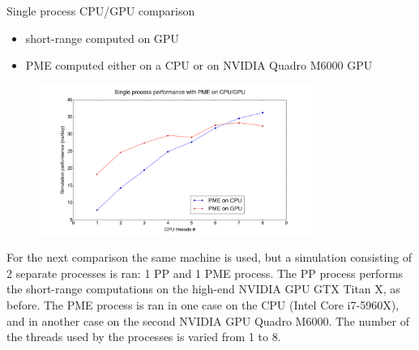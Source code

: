 \documentclass[11pt]{beamer}
\begin{document}
\begin{frame}{Single process CPU/GPU comparison}
\begin{itemize}
\item short-range computed on GPU
\item PME computed either on a CPU or on NVIDIA Quadro M6000 GPU
\end{itemize}
\FloatBarrier
\begin{figure} [h!]
    \centering
    \includegraphics[width=0.8\textwidth]{pics/CPU_GPU_ADH_SINGLE.png}
\end{figure}
\FloatBarrier
\end{frame}



For the next comparison the same machine is used, but a simulation consisting of 2 separate processes is ran: 1 PP and 1 PME process. The PP process performs the short-range computations on the high-end NVIDIA GPU GTX Titan X, as before.    
The PME process is ran in one case on the CPU (Intel Core i7-5960X), and in another case on the second NVIDIA GPU Quadro M6000. The number of the threads used by the processes is varied from 1 to 8.
 
\end{document}
